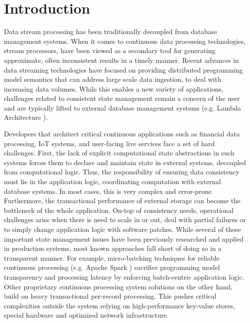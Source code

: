 
\section{Introduction}
\label{sec:intro}

Data stream processing has been traditionally decoupled from database management systems. When it comes to continuous data processing technologies, stream processors, have been viewed as a secondary tool for generating approximate, often inconsistent results in a timely manner. Recent advances in data streaming technologies have focused on providing distributed programming model semantics \cite{CUSTOM:web/Storm,CUSTOM:web/Samza} that can address large scale data ingestion, to deal with increasing data volumes. While this enables a new variety of applications, challenges related to consistent state management remain a concern of the user and are typically lifted to external database management systems (e.g. Lambda Architecture \cite{marz2015big}).

Developers that architect critical continuous applications such as financial data processing, IoT systems, and user-facing live services face a set of hard challenges. First, the lack of explicit computational state abstractions in such systems forces them to declare and maintain state in external systems, decoupled from computational logic. Thus, the responsibility of ensuring data consistency must lie in the application logic, coordinating computation with external database systems. In most cases, this is very complex and error-prone. Furthermore, the transactional performance of external storage can become the bottleneck of the whole application. On-top of consistency needs, operational challenges arise when there is need to scale in or out, deal with partial failures or to simply change application logic with software patches. While several of these important state management issues have been previously researched and applied in production systems, most known approaches fall short of doing so in a transparent manner. For example, micro-batching techniques for reliable continuous processing (e.g. Apache Spark \cite{zaharia2012discretized,CUSTOM:web/trident}) sacrifice programming model transparency and processing latency by enforcing batch-centric application logic. Other proprietary continuous processing system solutions \cite{millwheel} on the other hand, build on heavy transactional per-record processing. This pushes critical complexities outside the system relying on high-performance key-value stores, special hardware and optimized network infrastructure. 

